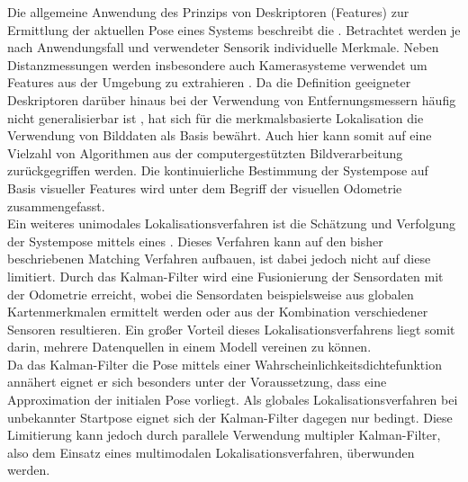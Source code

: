 Die allgemeine Anwendung des Prinzips von Deskriptoren (Features) zur Ermittlung der aktuellen Pose eines Systems beschreibt die . Betrachtet werden je nach Anwendungsfall und verwendeter Sensorik individuelle Merkmale. Neben Distanzmessungen \cite{Tomono2004} werden insbesondere auch Kamerasysteme verwendet um Features aus der Umgebung zu extrahieren \cite{Se2001}. Da die Definition geeigneter Deskriptoren darüber hinaus bei der Verwendung von Entfernungsmessern häufig nicht generalisierbar ist \red[belegen!?], hat sich für die merkmalsbasierte Lokalisation die Verwendung von Bilddaten als Basis bewährt. Auch hier kann somit auf eine Vielzahl von Algorithmen aus der computergestützten Bildverarbeitung zurückgegriffen werden. Die kontinuierliche Bestimmung der Systempose auf Basis visueller Features wird unter dem Begriff der visuellen Odometrie \cite{Mccarthy2003} zusammengefasst. \\

Ein weiteres unimodales Lokalisationsverfahren ist die Schätzung und Verfolgung der Systempose mittels eines . Dieses Verfahren kann auf den bisher beschriebenen Matching Verfahren aufbauen, ist dabei jedoch nicht auf diese limitiert. Durch das Kalman-Filter wird eine Fusionierung der Sensordaten mit der Odometrie  erreicht, wobei die Sensordaten beispielsweise aus globalen Kartenmerkmalen ermittelt werden \cite{Leonard1991} oder aus der Kombination verschiedener Sensoren \cite{Roumeliotis1997} resultieren. Ein großer Vorteil dieses Lokalisationsverfahrens liegt somit darin, mehrere Datenquellen in einem Modell vereinen zu können.\\ Da das Kalman-Filter die Pose mittels einer Wahrscheinlichkeitsdichtefunktion annähert eignet er sich besonders unter der Voraussetzung, dass eine Approximation der initialen Pose vorliegt. Als globales Lokalisationsverfahren bei unbekannter Startpose eignet sich der Kalman-Filter dagegen nur bedingt. Diese Limitierung kann jedoch durch parallele Verwendung multipler Kalman-Filter, also dem Einsatz eines multimodalen Lokalisationsverfahren, überwunden werden.
